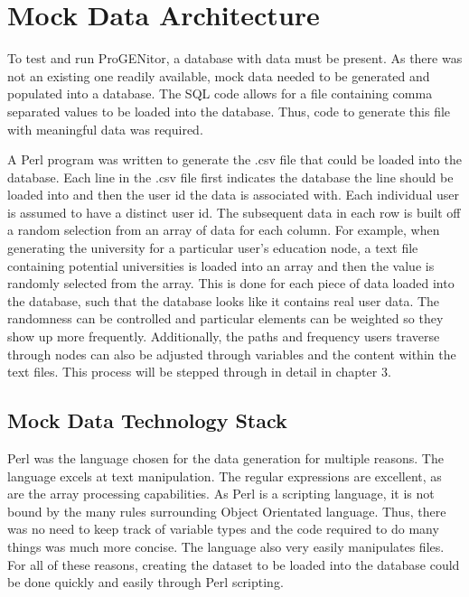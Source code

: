 \section{Mock Data Architecture}
	To test and run ProGENitor, a database with data must be present.  As there was
not an existing one readily available, mock data needed to be generated and
populated into a database.  The SQL code allows for a file containing comma
separated values to be loaded into the database.  Thus, code to generate this
file with meaningful data was required.  
	
A Perl program was written to generate the .csv file that could be loaded into
the database.  Each line in the .csv file first indicates the database the line
should be loaded into and then the user id the data is associated with.  Each
individual user is assumed to have a distinct user id.  The subsequent data in
each row is built off a random selection from an array of data for each column.
For example, when generating the university for a particular user's education
node, a text file containing potential universities is loaded into an array and
then the value is randomly selected from the array.  This is done for each piece
of data loaded into the database, such that the database looks like it contains
real user data.  The randomness can be controlled and particular elements can be
weighted so they show up more frequently.  Additionally, the paths and
frequency users traverse through nodes can also be adjusted through variables
and the content within the text files.  This process will be stepped through in
detail in chapter 3.

\subsection{Mock Data Technology Stack}
Perl was the language chosen for the data generation for multiple reasons.  The
language excels at text manipulation.  The regular expressions are excellent, as
are the array processing capabilities.  As Perl is a scripting language, it is
not bound by the many rules surrounding Object Orientated language.  Thus,
there was no need to keep track of variable types and the code required to do
many things was much more concise.  The language also very easily manipulates
files.  For all of these reasons, creating the dataset to be loaded into the
database could be done quickly and easily through Perl scripting.
